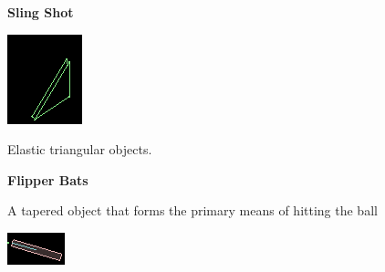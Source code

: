 \documentclass{article}
\begin{document}
    \textbf{Sling Shot}

    \begin{minipage}[t]{0.25\textwidth}
        \vspace{0pt}
        \centering
        \includegraphics[width=0.9\linewidth,natwidth=610,natheight=642]{slingshot.png} 
        \label{fig:slingshot}
    \end{minipage}
    \begin{minipage}[t]{0.6\textwidth}
        \vspace{0pt}
        Elastic triangular objects.
    \end{minipage}

    \textbf{Flipper Bats}

    \begin{minipage}[t]{0.6\textwidth}
        \vspace{0pt}
        A tapered object that forms the primary means of hitting the ball
    \end{minipage}
    \begin{minipage}[t]{0.25\textwidth}
        \vspace{0pt}
        \centering
        \includegraphics[width=0.9\linewidth,natwidth=610,natheight=642]{flippers.png} 
        \label{fig:flippers}
    \end{minipage}
\end{document}

